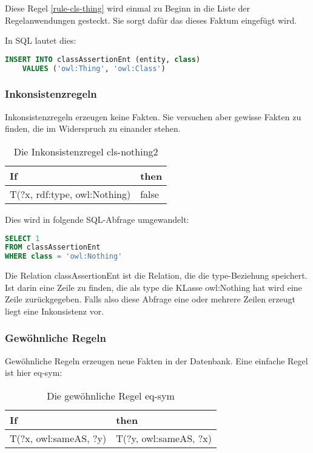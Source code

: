 Diese Regel \ref{rule-cls-thing} wird einmal zu Beginn in die Liste der Regelanwendungen gesteckt. Sie sorgt dafür das dieses Faktum eingefügt wird.

In SQL lautet dies:
\begin{lstlisting}[language=SQL]
INSERT INTO classAssertionEnt (entity, class)
	VALUES ('owl:Thing', 'owl:Class')
\end{lstlisting}

\subsubsection{Inkonsistenzregeln}
Inkonsistenzregeln erzeugen keine Fakten. Sie versuchen aber gewisse Fakten zu finden, die im Widerspruch zu einander stehen.

\begin{table}
\begin{tabular}{l|l}
If & then \\ \hline
T(?x, rdf:type, owl:Nothing) & false
\end{tabular}
\caption{Die Inkonsistenzregel cls-nothing2}
\label{rule-cls-nothing2}
\end{table}


Dies wird in folgende SQL-Abfrage umgewandelt:
\begin{lstlisting}[language=SQL]
SELECT 1
FROM classAssertionEnt
WHERE class = 'owl:Nothing'
\end{lstlisting}

Die Relation classAssertionEnt ist die Relation, die die type-Beziehung speichert. Ist darin eine Zeile zu finden, die als type die KLasse owl:Nothing hat wird eine Zeile zurückgegeben. Falls also diese Abfrage eine oder mehrere Zeilen erzeugt liegt eine Inkonsistenz vor.

\subsubsection{Gewöhnliche Regeln}
Gewöhnliche Regeln erzeugen neue Fakten in der Datenbank. Eine einfache Regel ist hier eq-sym:

\begin{table}
\begin{tabular}{l|l}
If & then \\ \hline
T(?x, owl:sameAS, ?y) & T(?y, owl:sameAS, ?x)

\end{tabular}
\caption{Die gewöhnliche Regel eq-sym}
\label{rule-eq-sym}
\end{table}

